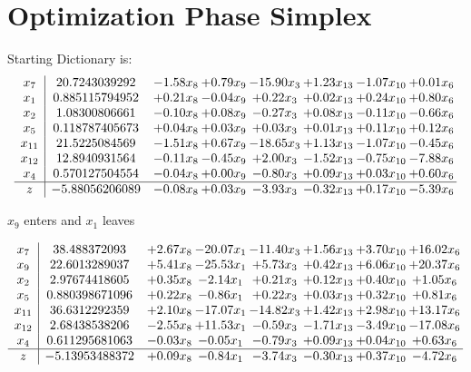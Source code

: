 \documentclass[9pt]{article}
\begin{document}
\section{Optimization Phase Simplex}
Starting Dictionary is:
\[\begin{array}{c| c c@{\hskip 2pt} c@{\hskip 2pt} c@{\hskip 2pt} c@{\hskip 2pt} c@{\hskip 2pt} c@{\hskip 2pt} }
 x_{7}   &  20.7243039292 & -1.58 x_{8} & +  0.79 x_{9} & -15.90 x_{3} & +  1.23 x_{13} & -1.07 x_{10} & +  0.01 x_{6}\\
 x_{1}   &  0.885115794952 & +  0.21 x_{8} & -0.04 x_{9} & +  0.22 x_{3} & +  0.02 x_{13} & +  0.24 x_{10} & +  0.80 x_{6}\\
 x_{2}   &  1.08300806661 & -0.10 x_{8} & +  0.08 x_{9} & -0.27 x_{3} & +  0.08 x_{13} & -0.11 x_{10} & -0.66 x_{6}\\
 x_{5}   &  0.118787405673 & +  0.04 x_{8} & +  0.03 x_{9} & +  0.03 x_{3} & +  0.01 x_{13} & +  0.11 x_{10} & +  0.12 x_{6}\\
 x_{11}   &  21.5225084569 & -1.51 x_{8} & +  0.67 x_{9} & -18.65 x_{3} & +  1.13 x_{13} & -1.07 x_{10} & -0.45 x_{6}\\
 x_{12}   &  12.8940931564 & -0.11 x_{8} & -0.45 x_{9} & +  2.00 x_{3} & -1.52 x_{13} & -0.75 x_{10} & -7.88 x_{6}\\
 x_{4}   &  0.570127504554 & -0.04 x_{8} & +  0.00 x_{9} & -0.80 x_{3} & +  0.09 x_{13} & +  0.03 x_{10} & +  0.60 x_{6}\\
\hline
z    &  -5.88056206089 & -0.08 x_{8} & +  0.03 x_{9} & -3.93 x_{3} & -0.32 x_{13} & +  0.17 x_{10} & -5.39 x_{6}\\
\end{array}\]


 $ x_{9} $ enters and $ x_{1} $ leaves 

 \[\begin{array}{c| c c@{\hskip 2pt} c@{\hskip 2pt} c@{\hskip 2pt} c@{\hskip 2pt} c@{\hskip 2pt} c@{\hskip 2pt} }
 x_{7}   &  38.488372093 & +  2.67 x_{8} & -20.07 x_{1} & -11.40 x_{3} & +  1.56 x_{13} & +  3.70 x_{10} & + 16.02 x_{6}\\
 x_{9}   &  22.6013289037 & +  5.41 x_{8} & -25.53 x_{1} & +  5.73 x_{3} & +  0.42 x_{13} & +  6.06 x_{10} & + 20.37 x_{6}\\
 x_{2}   &  2.97674418605 & +  0.35 x_{8} & -2.14 x_{1} & +  0.21 x_{3} & +  0.12 x_{13} & +  0.40 x_{10} & +  1.05 x_{6}\\
 x_{5}   &  0.880398671096 & +  0.22 x_{8} & -0.86 x_{1} & +  0.22 x_{3} & +  0.03 x_{13} & +  0.32 x_{10} & +  0.81 x_{6}\\
 x_{11}   &  36.6312292359 & +  2.10 x_{8} & -17.07 x_{1} & -14.82 x_{3} & +  1.42 x_{13} & +  2.98 x_{10} & + 13.17 x_{6}\\
 x_{12}   &  2.68438538206 & -2.55 x_{8} & + 11.53 x_{1} & -0.59 x_{3} & -1.71 x_{13} & -3.49 x_{10} & -17.08 x_{6}\\
 x_{4}   &  0.611295681063 & -0.03 x_{8} & -0.05 x_{1} & -0.79 x_{3} & +  0.09 x_{13} & +  0.04 x_{10} & +  0.63 x_{6}\\
\hline
z    &  -5.13953488372 & +  0.09 x_{8} & -0.84 x_{1} & -3.74 x_{3} & -0.30 x_{13} & +  0.37 x_{10} & -4.72 x_{6}\\
\end{array}\]
\end{document}

